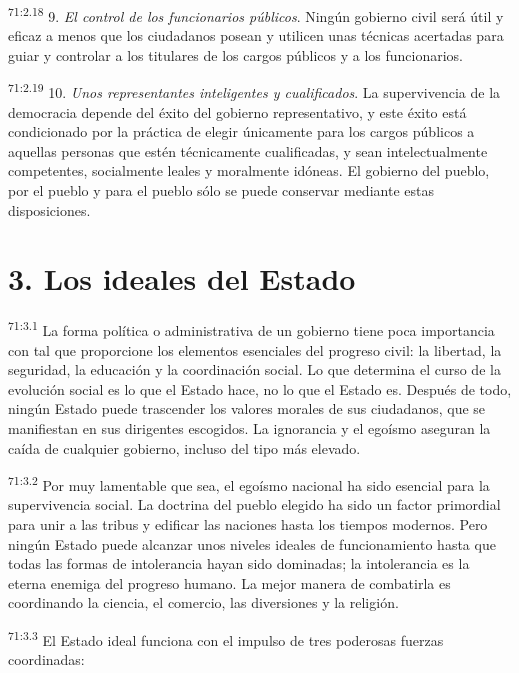 \documentclass[twoside, 11pt]{book}
\begin{document}
\par
\textsuperscript{71:2.18} 9. \textit{El control de los funcionarios públicos}. Ningún gobierno civil será útil y eficaz a menos que los ciudadanos posean y utilicen unas técnicas acertadas para guiar y controlar a los titulares de los cargos públicos y a los funcionarios.

\par
\textsuperscript{71:2.19} 10. \textit{Unos representantes inteligentes y cualificados}. La supervivencia de la democracia depende del éxito del gobierno representativo, y este éxito está condicionado por la práctica de elegir únicamente para los cargos públicos a aquellas personas que estén técnicamente cualificadas, y sean intelectualmente competentes, socialmente leales y moralmente idóneas. El gobierno del pueblo, por el pueblo y para el pueblo sólo se puede conservar mediante estas disposiciones.

\section*{3. Los ideales del Estado}
\par
\textsuperscript{71:3.1} La forma política o administrativa de un gobierno tiene poca importancia con tal que proporcione los elementos esenciales del progreso civil: la libertad, la seguridad, la educación y la coordinación social. Lo que determina el curso de la evolución social es lo que el Estado hace, no lo que el Estado es. Después de todo, ningún Estado puede trascender los valores morales de sus ciudadanos, que se manifiestan en sus dirigentes escogidos. La ignorancia y el egoísmo aseguran la caída de cualquier gobierno, incluso del tipo más elevado.

\par
\textsuperscript{71:3.2} Por muy lamentable que sea, el egoísmo nacional ha sido esencial para la supervivencia social. La doctrina del pueblo elegido ha sido un factor primordial para unir a las tribus y edificar las naciones hasta los tiempos modernos. Pero ningún Estado puede alcanzar unos niveles ideales de funcionamiento hasta que todas las formas de intolerancia hayan sido dominadas; la intolerancia es la eterna enemiga del progreso humano. La mejor manera de combatirla es coordinando la ciencia, el comercio, las diversiones y la religión.

\par
\textsuperscript{71:3.3} El Estado ideal funciona con el impulso de tres poderosas fuerzas coordinadas:
\end{document}
